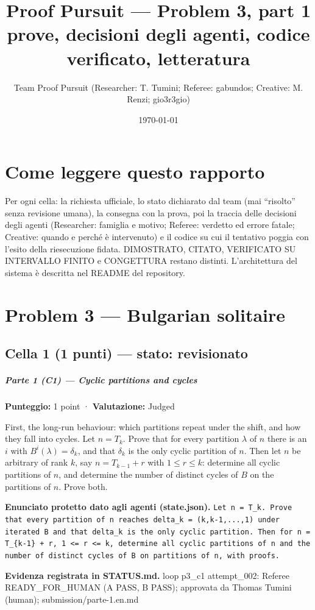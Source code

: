 \documentclass[11pt,a4paper]{article}
\title{Proof Pursuit --- Problem 3, part 1\\ \large prove, decisioni degli agenti, codice verificato, letteratura}
\author{Team Proof Pursuit (Researcher: T. Tumini; Referee: gabundos; Creative: M. Renzi; gio3r3gio)}
\date{\today}
\begin{document}
\maketitle\tableofcontents
\section*{Come leggere questo rapporto}
Per ogni cella: la richiesta ufficiale, lo stato dichiarato dal team (mai ``risolto'' senza revisione umana), la consegna
con la prova, poi la traccia delle decisioni degli agenti (Researcher: famiglia e motivo; Referee: verdetto ed errore
fatale; Creative: quando e perché è intervenuto) e il codice su cui il tentativo poggia con l'esito della riesecuzione
fidata. DIMOSTRATO, CITATO, VERIFICATO SU INTERVALLO FINITO e CONGETTURA restano distinti. L'architettura del sistema
è descritta nel README del repository.
\section{Problem 3 — Bulgarian solitaire}
\subsection{Cella 1 (1 punti) — stato: revisionato}
\subparagraph{Parte 1 (C1) --- Cyclic partitions and
cycles}\label{parte-1-c1-cyclic-partitions-and-cycles}

\textbf{Punteggio:} 1 point · \textbf{Valutazione:} Judged

First, the long-run behaviour: which partitions repeat under the shift,
and how they fall into cycles. Let \(n = T_k\). Prove that for every
partition \(\lambda\) of \(n\) there is an \(i\) with
\(B^i(\lambda) = \delta_k\), and that \(\delta_k\) is the only cyclic
partition of \(n\). Then let \(n\) be arbitrary of rank \(k\), say
\(n = T_{k-1} + r\) with \(1 \le r \le k\): determine all cyclic
partitions of \(n\), and determine the number of distinct cycles of
\(B\) on the partitions of \(n\). Prove both.

\textbf{Enunciato protetto dato agli agenti (state.json).} \texttt{Let n = T\_k. Prove that every partition of n reaches delta\_k = (k,k-1,...,1) under iterated B and that delta\_k is the only cyclic partition. Then for n = T\_\{k-1\} + r, 1 \textless{}= r \textless{}= k, determine all cyclic partitions of n and the number of distinct cycles of B on partitions of n, with proofs.}

\textbf{Evidenza registrata in STATUS.md.} loop p3\_c1 attempt\_002: Referee READY\_FOR\_HUMAN (A PASS, B PASS); approvata da Thomas Tumini (human); submission/parte-1.en.md
\end{document}
